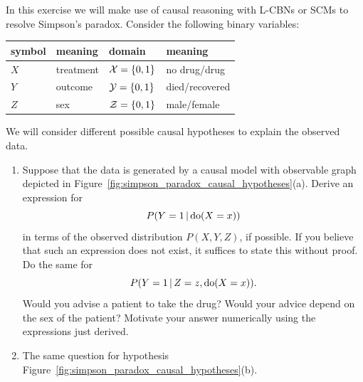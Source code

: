 In this exercise we will make use of causal reasoning with L-CBNs or SCMs to resolve Simpson's paradox.
Consider the following binary variables:
\begin{center}\begin{tabular}{llll}
  symbol & meaning & domain & meaning \\
  \hline
  $X$ & treatment & $\mathcal{X} = \{0,1\}$ & no drug/drug \\
  $Y$ & outcome   & $\mathcal{Y} = \{0,1\}$ & died/recovered \\
  $Z$ & sex       & $\mathcal{Z} = \{0,1\}$ & male/female
\end{tabular}\end{center}
We will consider different possible causal hypotheses to explain the observed data.
\begin{enumerate}[label=\alph*)]
  \item Suppose that the data is generated by a causal model with observable graph depicted in Figure~\ref{fig:simpson_paradox_causal_hypotheses}(a). Derive an expression for
    $$P(Y=1 \operatorname*{|} \operatorname{do}(X=x))$$
    in terms of the observed distribution $P(X,Y,Z)$, if possible.
    If you believe that such an expression does not exist, it suffices to state this without proof.
    Do the same for
    $$P(Y=1 \operatorname*{|} Z=z,\operatorname{do}(X=x)).$$
    Would you advise a patient to take the drug? Would your advice depend on the sex of the patient? 
    Motivate your answer numerically using the expressions just derived.
  \item The same question for hypothesis Figure~\ref{fig:simpson_paradox_causal_hypotheses}(b).

\end{enumerate}
